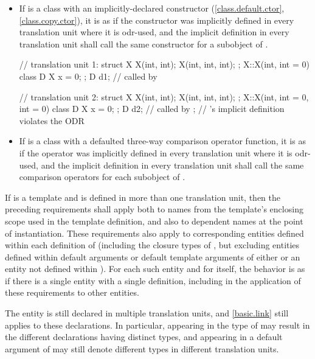 \begin{itemize}
\item If  is a class with an implicitly-declared
constructor (\ref{class.default.ctor}, \ref{class.copy.ctor}),
it is as if the constructor was
implicitly defined in every translation unit where it is odr-used, and the
implicit definition in every translation unit shall call the same
constructor for a subobject of .
\begin{example}
\begin{codeblock}
// translation unit 1:
struct X {
  X(int, int);
  X(int, int, int);
};
X::X(int, int = 0) { }
class D {
  X x = 0;
};
D d1;                           //  called by 

// translation unit 2:
struct X {
  X(int, int);
  X(int, int, int);
};
X::X(int, int = 0, int = 0) { }
class D {
  X x = 0;
};
D d2;                           //  called by ;
                                // 's implicit definition violates the ODR
\end{codeblock}
\end{example}

\item If  is a class with
a defaulted three-way comparison operator function,
it is as if the operator was
implicitly defined in every translation unit where it is odr-used, and the
implicit definition in every translation unit shall call the same
comparison operators for each subobject of .
\end{itemize}

\pnum
If  is a template and is defined in more than one
translation unit, then the preceding requirements
shall apply both to names from the template's enclosing scope used in the
template definition, and also to dependent names at
the point of instantiation.
These requirements also apply to corresponding entities
defined within each definition of 
(including the closure types of ,
but excluding entities defined within default arguments or
default template arguments of either  or
an entity not defined within ).
For each such entity and for  itself,
the behavior is as if there is a single entity with a single definition,
including in the application of these requirements to other entities.
\begin{note}
The entity is still declared in multiple translation units, and \ref{basic.link}
still applies to these declarations. In particular,
appearing in the type of  may result
in the different declarations having distinct types, and
 appearing in a default argument of 
may still denote different types in different translation units.
\end{note}

